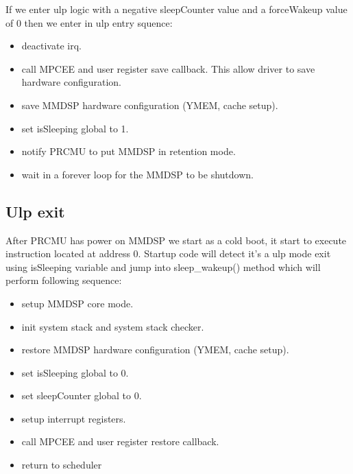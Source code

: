 If we enter ulp logic with a negative sleepCounter value and a forceWakeup value
of 0 then we enter in ulp entry squence:
\begin{itemize}
  \item deactivate irq.
  \item call MPCEE and user register save callback. This allow driver to save
  hardware configuration.
  \item save MMDSP hardware configuration (YMEM, cache setup).
  \item set isSleeping global to 1.
  \item notify PRCMU to put MMDSP in retention mode.
  \item wait in a forever loop for the MMDSP to be shutdown.
\end{itemize}

\subsection{Ulp exit}
After PRCMU has power on MMDSP we start as a cold boot, it start to execute
instruction located at address 0. Startup code will detect it's a ulp mode exit
using isSleeping variable and jump into sleep\_wakeup() method which will
perform following sequence:
\begin{itemize}
  \item setup MMDSP core mode.
  \item init system stack and system stack checker.
  \item restore MMDSP hardware configuration (YMEM, cache setup).
  \item set isSleeping global to 0.
  \item set sleepCounter global to 0.
  \item setup interrupt registers.
  \item call MPCEE and user register restore callback.
  \item return to scheduler
\end{itemize}
